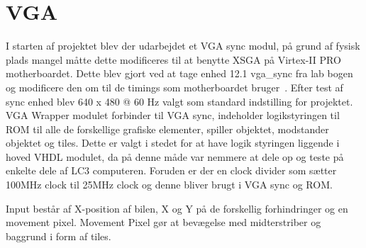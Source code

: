 \section{VGA}
I starten af projektet blev der udarbejdet et VGA sync modul, på grund af fysisk plads mangel måtte dette modificeres til at benytte XSGA på Virtex-II PRO motherboardet. Dette blev gjort ved at tage enhed 12.1 vga\_sync fra lab bogen~\cite{chu} og modificere den om til de timings som motherboardet bruger~\cite{hardwaremanual tabel 2-6 side 37}.
Efter test af sync enhed blev 640 x 480 @ 60 Hz valgt som standard indstilling for projektet.
VGA Wrapper modulet forbinder til VGA sync, indeholder logikstyringen til ROM til alle de forskellige grafiske elementer, spiller objektet, modstander objektet og tiles. Dette er valgt i stedet for at have logik styringen liggende i hoved VHDL modulet, da på denne måde var nemmere at dele op og teste på enkelte dele af LC3 computeren. Foruden er der en clock divider som sætter 100MHz clock til 25MHz clock og denne bliver brugt i VGA sync og ROM. 

Input består af X-position af bilen, X og Y på de forskellig forhindringer og en movement pixel. Movement Pixel gør at bevægelse med midterstriber og baggrund i form af tiles.
